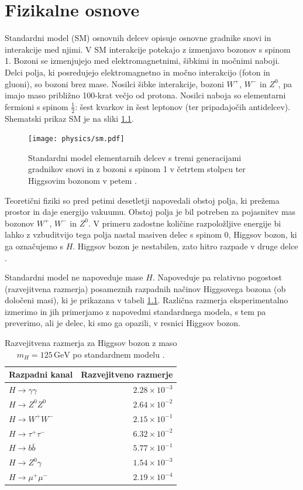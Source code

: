 \documentclass[11pt,a4paper,openany]{book}
\begin{document}
\chapter{Fizikalne osnove}
\label{ch:basics}
Standardni model (SM) osnovnih delcev opisuje osnovne gradnike snovi in interakcije med njimi. V SM interakcije potekajo z izmenjavo bozonov s spinom 1. Bozoni se izmenjujejo med elektromagnetnimi, šibkimi in močnimi naboji. Delci polja, ki posredujejo elektromagnetno in močno interakcijo (foton in gluoni), so bozoni brez mase. Nosilci šibke interakcije, bozoni $W^+$, $W^-$ in $Z^0$, pa imajo maso približno 100-krat večjo od protona. Nosilci naboja so elementarni fermioni s spinom $\frac{1}{2}$: šest kvarkov in šest leptonov (ter pripadajočih antidelcev). Shematski prikaz SM je na sliki \ref{sl:sm}.

\begin{figure}[ht]
	\centering
	\texttt{[image: physics/sm.pdf]}
	
	\caption{ Standardni model elementarnih delcev s tremi generacijami gradnikov snovi in z bozoni s spinom 1 v četrtem stolpcu ter Higgsovim bozonom v petem \cite{WikiSM}. }
	\label{sl:sm}
\end{figure}

Teoretični fiziki so pred petimi desetletji napovedali obstoj polja, ki prežema prostor in daje energijo vakuumu. Obstoj polja je bil potreben za pojasnitev mas bozonov $W^+$, $W^-$ in $Z^0$. V primeru zadostne količine razpoložljive energije bi lahko z vzbuditvijo tega polja nastal masiven delec s spinom 0, Higgsov bozon, ki ga označujemo s $H$. Higgsov bozon je nestabilen, zato hitro razpade v druge delce \cite{ChallengeDoc, AadScience2012}. 

Standardni model ne napoveduje mase $H$. Napoveduje pa relativno pogostost (razvejitvena razmerja) posameznih razpadnih načinov Higgsovega bozona (ob določeni masi), ki je prikazana v tabeli \ref{tb:pdghiggs}. Različna razmerja eksperimentalno izmerimo in jih primerjamo z napovedmi standardnega modela, s tem pa preverimo, ali je delec, ki smo ga opazili, v resnici Higgsov bozon.

\begin{table}[ht]
	\centering
	\begin{tabular}{lr}
		\hline
		\textbf{Razpadni kanal} & \textbf{Razvejitveno razmerje} \\
		\hline
		$H \rightarrow \gamma\gamma$ & $\num{2,28} \times 10^{-3}$ \\	
		$H \rightarrow Z^0Z^0$ & $\num{2,64} \times 10^{-2}$ \\
		$H \rightarrow W^+W^-$ & $\num{2,15} \times 10^{-1}$ \\
		$H \rightarrow \tau^+\tau^-$ & $\num{6,32} \times 10^{-2}$ \\
		$H \rightarrow b\bar{b}$ & $\num{5,77} \times 10^{-1}$ \\
		$H \rightarrow Z^0\gamma$ & $\num{1,54} \times 10^{-3}$ \\
		$H \rightarrow \mu^+\mu^-$ & $\num{2,19} \times 10^{-4}$
	\end{tabular}
	\caption{Razvejitvena razmerja za Higgsov bozon z maso $m_H = 125\,\text{GeV}$ po standardnem modelu \cite{PDGHiggs}.}
	\label{tb:pdghiggs}
\end{table}
\end{document}
